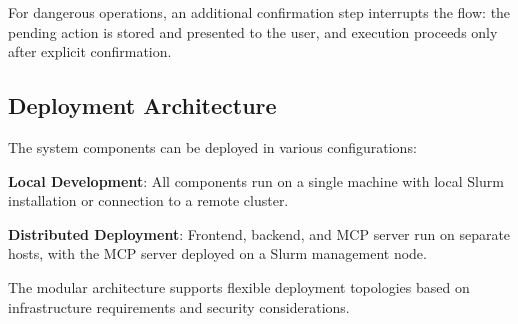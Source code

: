 For dangerous operations, an additional confirmation step interrupts the flow: the pending action is stored and presented to the user, and execution proceeds only after explicit confirmation.

\subsection{Deployment Architecture}

The system components can be deployed in various configurations:

\textbf{Local Development}: All components run on a single machine with local Slurm installation or connection to a remote cluster.

\textbf{Distributed Deployment}: Frontend, backend, and MCP server run on separate hosts, with the MCP server deployed on a Slurm management node.

The modular architecture supports flexible deployment topologies based on infrastructure requirements and security considerations.
